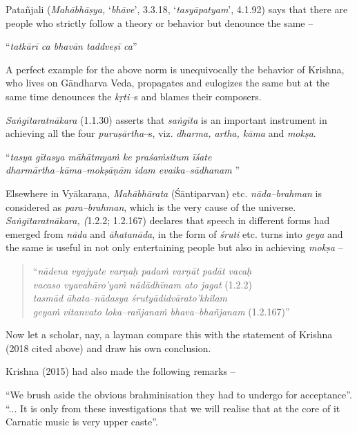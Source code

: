 Patañjali (\textit{Mahābhāṣya,} ‘\textit{bhāve}’, 3.3.18, ‘\textit{tasyāpatyam}’, 4.1.92) says that there are people who strictly follow a theory or behavior but denounce the same –

\begin{myquote}
“\textit{tatkārī ca bhavān taddveṣī ca}”
\end{myquote}

A perfect example for the above norm is unequivocally the behavior of Krishna, who lives on Gāndharva Veda, propagates and eulogizes the same but at the same time denounces the \textit{kṛti}–s and blames their composers. 

\textit{Saṅgītaratnākara} (1.1.30) asserts that \textit{saṅgīta} is an important instrument in achieving all the four \textit{puruṣārtha}–s, viz. \textit{dharma, artha, kāma} and \textit{mokṣa}.

\newpage

\begin{myquote}
“\textit{tasya gītasya māhātmyaṁ ke praśaṁsitum īśate} \\\textit{dharmārtha–kāma–mokṣāṇām idam evaika–sādhanam} ”
\end{myquote}

Elsewhere in Vyākaraṇa\textit{, Mahābhārata} (Śāntiparvan) etc. \textit{nāda–brahman} is considered as \textit{para–brahman}, which is the very cause of the universe. \textit{Saṅgītaratnākara, (}1.2.2; 1.2.167) declares that speech in different forms had emerged from \textit{nāda} and \textit{āhatanāda}, in the form of \textit{śruti} etc. turns into \textit{geya} and the same is useful in not only entertaining people but also in achieving \textit{mokṣa} –

\begin{verse}
“\textit{nādena vyajyate varṇaḥ padaṁ varṇāt padāt vacaḥ} \\\textit{vacaso vyavahāro’yaṁ nādādhīnam ato jagat}  (1.2.2)\\\textit{tasmād āhata–nādasya śrutyādidvārato’khilam} \\\textit{geyaṁ vitanvato loka–rañjanaṁ bhava–bhañjanam}  (1.2.167)”
\end{verse}

Now let a scholar, nay, a layman compare this with the statement of Krishna (2018 cited above) and draw his own conclusion.

Krishna (2015) had also made the following remarks –  

\begin{myquote}
“We brush aside the obvious brahminisation they had to undergo for acceptance”. “... It is only from these investigations that we will realise that at the core of it Carnatic music is very upper caste”.
\end{myquote}

